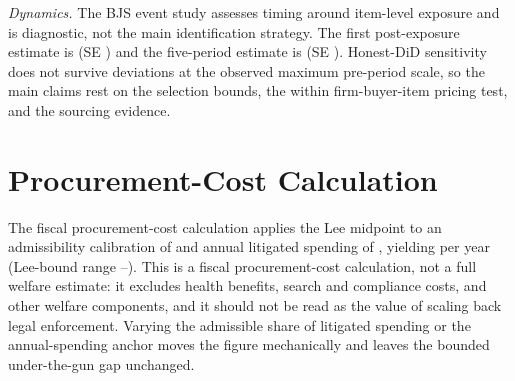 \textit{Dynamics.} The BJS event study assesses timing around item-level exposure and is diagnostic, not the main identification strategy. The first post-exposure estimate is \BPbjsETzero{} (SE \BPbjsETzeroSE{}) and the five-period estimate is \BPbjsETfive{} (SE \BPbjsETfiveSE{}). Honest-DiD sensitivity does not survive deviations at the observed maximum pre-period scale, so the main claims rest on the selection bounds, the within firm-buyer-item pricing test, and the sourcing evidence.



\FloatBarrier

\section{Procurement-Cost Calculation}
\label{app:cost}

The fiscal procurement-cost calculation applies the Lee midpoint \BPprocCostBoundUTGmidPct{} to an admissibility calibration of \BPprocCostBoundAdmissibility{} and annual litigated spending of \BPprocCostBoundAnnualSpend{}, yielding \BPprocCostBound{} per year (Lee-bound range \BPprocCostBoundCIlow{}--\BPprocCostBoundCIhigh{}). This is a fiscal procurement-cost calculation, not a full welfare estimate: it excludes health benefits, search and compliance costs, and other welfare components, and it should not be read as the value of scaling back legal enforcement. Varying the admissible share of litigated spending or the annual-spending anchor moves the figure mechanically and leaves the bounded under-the-gun gap unchanged.



